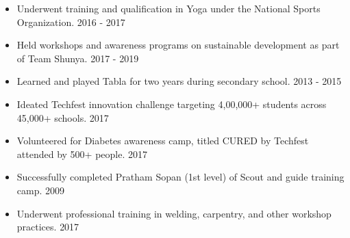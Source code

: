 
\begin{itemize}
    \setlength\itemsep{0.7mm}
    \item Underwent training and qualification in Yoga under the National Sports Organization. \hfill {2016 - 2017}
    \item Held workshops and awareness programs on sustainable development as part of Team Shunya. \hfill {2017 - 2019}
    \item Learned and played Tabla for two years during secondary school. \hfill {2013 - 2015} 
    \item Ideated Techfest innovation challenge targeting 4,00,000+ students across 45,000+ schools. \hfill {2017}
    \item Volunteered for Diabetes awareness camp, titled CURED by Techfest attended by 500+ people. \hfill {2017}
    \item Successfully completed Pratham Sopan (1st level) of Scout and guide training camp. \hfill {2009}
    \item Underwent professional training in welding, carpentry, and other workshop practices. \hfill {2017}
\end{itemize}